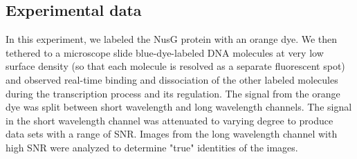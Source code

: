 \subsection{Experimental data}

In this experiment, we labeled the NusG protein with an orange dye. We then tethered to a microscope slide blue-dye-labeled DNA molecules at very low surface density (so that each molecule is resolved as a separate fluorescent spot) and observed real-time binding and dissociation of the other labeled molecules during the transcription process and its regulation. The signal from the orange dye was split between short wavelength and long wavelength channels. The signal in the short wavelength channel was attenuated to varying degree to produce data sets with a range of SNR. Images from the long wavelength channel with high SNR were analyzed to determine "true" identities of the images.






